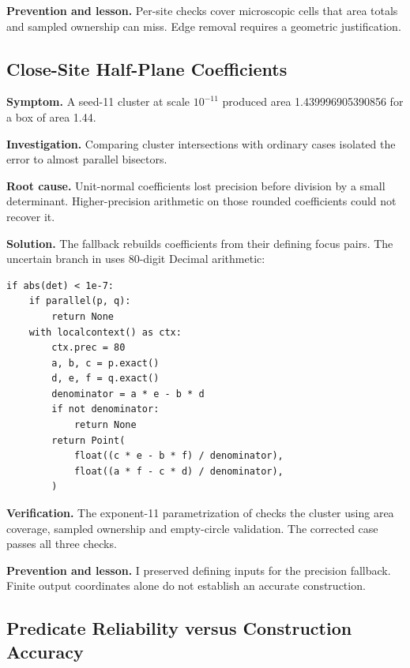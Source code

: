 \textbf{Prevention and lesson.} Per-site checks cover microscopic cells that area totals and sampled ownership can miss. Edge removal requires a geometric justification.

\clearpage
\subsection{Close-Site Half-Plane Coefficients}
\label{prob:coefficients}

\textbf{Symptom.} A seed-11 cluster at scale $10^{-11}$ produced area 1.439996905390856 for a box of area 1.44.

\textbf{Investigation.} Comparing cluster intersections with ordinary cases isolated the error to almost parallel bisectors.

\textbf{Root cause.} Unit-normal coefficients lost precision before division by a small determinant. Higher-precision arithmetic on those rounded coefficients could not recover it.

\textbf{Solution.} The fallback rebuilds coefficients from their defining focus pairs. The uncertain branch in  uses 80-digit Decimal arithmetic:

\noindent\begin{minipage}{\linewidth}
\begin{lstlisting}[caption={Reconstruct an ill-conditioned intersection from its defining sites.},label={lst:intersection-fix}]
if abs(det) < 1e-7:
    if parallel(p, q):
        return None
    with localcontext() as ctx:
        ctx.prec = 80
        a, b, c = p.exact()
        d, e, f = q.exact()
        denominator = a * e - b * d
        if not denominator:
            return None
        return Point(
            float((c * e - b * f) / denominator),
            float((a * f - c * d) / denominator),
        )
\end{lstlisting}
\end{minipage}

\textbf{Verification.} The exponent-11 parametrization of  checks the cluster using area coverage, sampled ownership and empty-circle validation. The corrected case passes all three checks.

\textbf{Prevention and lesson.} I preserved defining inputs for the precision fallback. Finite output coordinates alone do not establish an accurate construction.

\clearpage
\subsection{Predicate Reliability versus Construction Accuracy}

